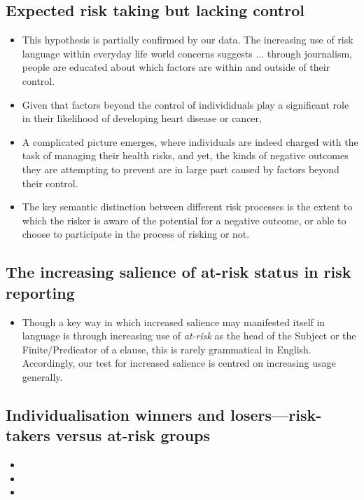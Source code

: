 \subsection*{Expected risk taking but lacking control}

\begin{itemize}
\item This hypothesis is partially confirmed by our data. The increasing use of risk language within everyday life world concerns suggests ...
through journalism, people are educated about which factors are within and outside of their control.
\item Given that factors beyond the control of individiduals play a significant role in their likelihood of developing heart disease or cancer, 
\item A complicated picture emerges, where individuals are indeed charged with the task of managing their health risks, and yet, the kinds of negative outcomes they are attempting to prevent are in large part caused by factors beyond their control.
\item The key semantic distinction between different risk processes is the extent to which the risker is aware of the potential for a negative outcome, or able to choose to participate in the process of risking or not.
\end{itemize}

\subsection*{The increasing salience of at-risk status in risk reporting}

\begin{itemize}
\item Though a key way in which increased salience may manifested itself in language is through increasing use of \emph{at-risk} as the head of the Subject or the Finite\slash Predicator of a clause, this is rarely grammatical in English. Accordingly, our test for increased salience is centred on increasing usage generally.
\end{itemize}

\subsection*{Individualisation winners and losers---risk-takers versus at-risk groups}

\begin{itemize}
    \item 
    \item 
    \item 
\end{itemize}

